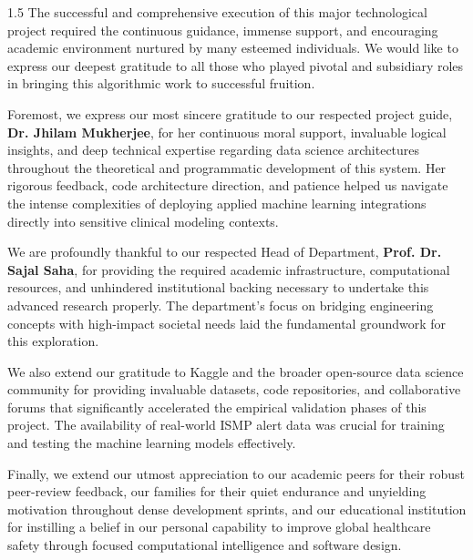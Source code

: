 \documentclass[12pt,a4paper]{report}
\begin{document}
\begin{spacing}{1.5}
The successful and comprehensive execution of this major technological project required the continuous guidance, immense support, and encouraging academic environment nurtured by many esteemed individuals. We would like to express our deepest gratitude to all those who played pivotal and subsidiary roles in bringing this algorithmic work to successful fruition.

Foremost, we express our most sincere gratitude to our respected project guide, \textbf{Dr. Jhilam Mukherjee}, for her continuous moral support, invaluable logical insights, and deep technical expertise regarding data science architectures throughout the theoretical and programmatic development of this system. Her rigorous feedback, code architecture direction, and patience helped us navigate the intense complexities of deploying applied machine learning integrations directly into sensitive clinical modeling contexts.

We are profoundly thankful to our respected Head of Department, \textbf{Prof. Dr. Sajal Saha}, for providing the required academic infrastructure, computational resources, and unhindered institutional backing necessary to undertake this advanced research properly. The department's focus on bridging engineering concepts with high-impact societal needs laid the fundamental groundwork for this exploration.

We also extend our gratitude to Kaggle and the broader open-source data science community for providing invaluable datasets, code repositories, and collaborative forums that significantly accelerated the empirical validation phases of this project. The availability of real-world ISMP alert data was crucial for training and testing the machine learning models effectively.

Finally, we extend our utmost appreciation to our academic peers for their robust peer-review feedback, our families for their quiet endurance and unyielding motivation throughout dense development sprints, and our educational institution for instilling a belief in our personal capability to improve global healthcare safety through focused computational intelligence and software design.
\end{spacing}

\clearpage
\tableofcontents

\clearpage
\listoffigures

\vspace{2cm}
\listoftables
\end{document}
